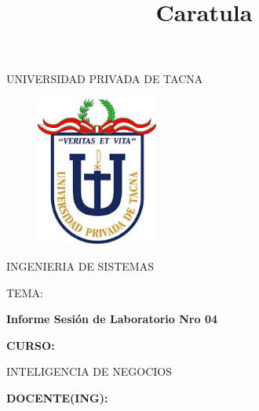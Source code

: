\documentclass[12pt,letterpaper]{article}
\begin{document}
%


\title{Caratula}

\begin{titlepage}
\begin{center}
\large{UNIVERSIDAD PRIVADA DE TACNA}\\
\vspace*{-0.025in}
\begin{figure}[htb]
\begin{center}
\includegraphics[width=4cm]{./Imagenes/logo}
\end{center}
\end{figure}
\vspace*{0.15in}
INGENIERIA DE SISTEMAS  \\

\vspace*{0.5in}
\begin{large}
TEMA:\\
\end{large}

\vspace*{0.1in}
\begin{Large}
\textbf{Informe Sesión de Laboratorio Nro 04} \\
\end{Large}

\vspace*{0.3in}
\begin{Large}
\textbf{CURSO:} \\
\end{Large}

\vspace*{0.1in}
\begin{large}
INTELIGENCIA DE NEGOCIOS\\
\end{large}

\vspace*{0.3in}
\begin{Large}
\textbf{DOCENTE(ING):} \\
\end{Large}


\end{center}
\end{titlepage}
\end{document}
